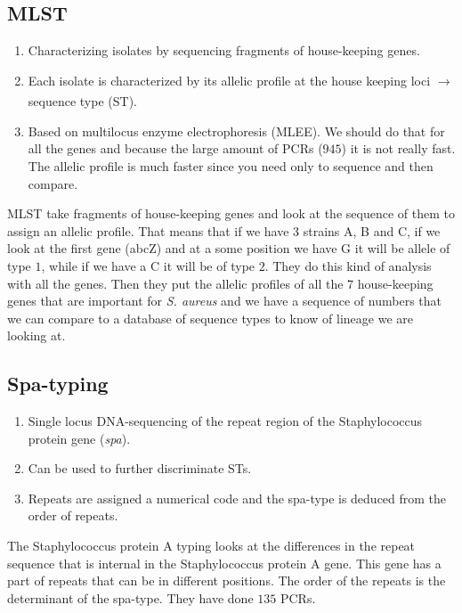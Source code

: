 \subsection{MLST}

\begin{enumerate}
    \item Characterizing isolates by sequencing fragments of house-keeping genes. 
    \item Each isolate is characterized by its allelic profile at the house keeping loci $\xrightarrow[]{}$ sequence type (ST). 
    \item Based on multilocus enzyme electrophoresis (MLEE). We should do that for all the genes and because the large amount of PCRs ($945$) it is not really fast. The allelic profile is much faster since you need only to sequence and then compare. 
\end{enumerate}

MLST take fragments of house-keeping genes and look at the sequence of them to assign an allelic profile. That means that if we have $3$ strains A, B and C, if we look at the first gene (abcZ) and at a some position we have G it will be allele of type $1$, while if we have a C it will be of type $2$. They do this kind of analysis with all the genes. Then they put the allelic profiles of all the $7$ house-keeping genes that are important for \emph{S. aureus} and we have a sequence of numbers that we can compare to a database of sequence types to know of lineage we are looking at. 

\subsection{Spa-typing}

\begin{enumerate}
    \item Single locus DNA-sequencing of the repeat region of the Staphylococcus protein gene (\emph{spa}).
    \item Can be used to further discriminate STs. 
    \item Repeats are assigned a numerical code and the spa-type is deduced from the order of repeats. 
\end{enumerate}

The Staphylococcus protein A typing looks at the differences in the repeat sequence that is internal in the Staphylococcus protein A gene. This gene has a part of repeats that can be in different positions. The order of the repeats is the determinant of the spa-type. 
They have done $135$ PCRs.

